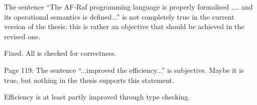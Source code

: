 \documentclass{article}
\newenvironment{them}{\noindent\begingroup\color{blue}}{\endgroup\par}
\begin{document}
\begin{them}

The sentence “The AF-Raf programming language is properly formalised .... and
its operational semantics is defined...” is not completely true in the current
version of the thesis: this is rather an objective that should be achieved in
the revised one.

\end{them}
Fixed. All is checked for correctness.

\begin{them}

Page 119:
The sentence “...improved the efficiency...” is subjective. Maybe it is true,
but nothing in the thesis supports this statement.

\end{them}
Efficiency is at least partly improved through type checking.
\end{document}
